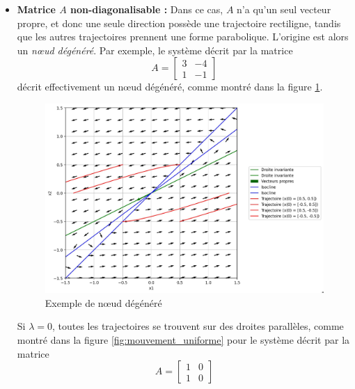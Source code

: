 \begin{itemize}
                \item \textbf{Matrice $A$ non-diagonalisable :} Dans ce cas, $A$ n'a qu'un seul vecteur propre, et donc une seule direction possède une trajectoire rectiligne, tandis que les autres trajectoires prennent une forme parabolique. L'origine est alors un \textit{nœud dégénéré}. Par exemple, le système décrit par la matrice
                \begin{equation}
                    A = \begin{bmatrix} 3 & -4 \\ 1 & -1 \end{bmatrix}
                \end{equation}
                décrit effectivement un nœud dégénéré, comme montré dans la figure \ref{fig:noeud_degenere}.
                \begin{figure}[ht!]
                    \centering
                    \includegraphics[width=\textwidth]{images/noeud_degenere.jpg}
                    \caption{Exemple de nœud dégénéré}
                    \label{fig:noeud_degenere}
                \end{figure}
                Si $\lambda = 0$, toutes les trajectoires se trouvent sur des droites parallèles, comme montré dans la figure \ref{fig:mouvement_uniforme} pour le système décrit par la matrice
                \begin{equation}
                    A = \begin{bmatrix} 1 & 0 \\ 1 & 0 \end{bmatrix}
                \end{equation}
                \begin{figure}[ht!]

\end{figure}
\end{itemize}
